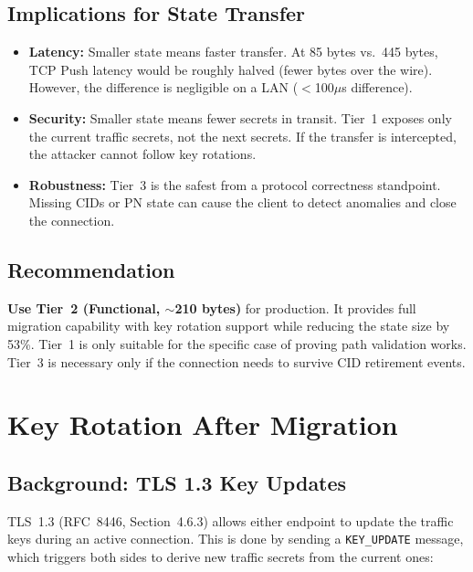 \documentclass[11pt,a4paper]{article}
\begin{document}
\subsection{Implications for State Transfer}

\begin{itemize}
    \item \textbf{Latency:} Smaller state means faster transfer. At 85 bytes vs.\ 445 bytes, TCP Push latency would be roughly halved (fewer bytes over the wire). However, the difference is negligible on a LAN ($<$100$\mu$s difference).
    \item \textbf{Security:} Smaller state means fewer secrets in transit. Tier~1 exposes only the current traffic secrets, not the next secrets. If the transfer is intercepted, the attacker cannot follow key rotations.
    \item \textbf{Robustness:} Tier~3 is the safest from a protocol correctness standpoint. Missing CIDs or PN state can cause the client to detect anomalies and close the connection.
\end{itemize}

\subsection{Recommendation}

\textbf{Use Tier~2 (Functional, $\sim$210 bytes)} for production. It provides full migration capability with key rotation support while reducing the state size by 53\%. Tier~1 is only suitable for the specific case of proving path validation works. Tier~3 is necessary only if the connection needs to survive CID retirement events.

\newpage
\section{Key Rotation After Migration}

\subsection{Background: TLS 1.3 Key Updates}

TLS~1.3 (RFC~8446, Section~4.6.3) allows either endpoint to update the traffic keys during an active connection. This is done by sending a \texttt{KEY\_UPDATE} message, which triggers both sides to derive new traffic secrets from the current ones:
\end{document}

